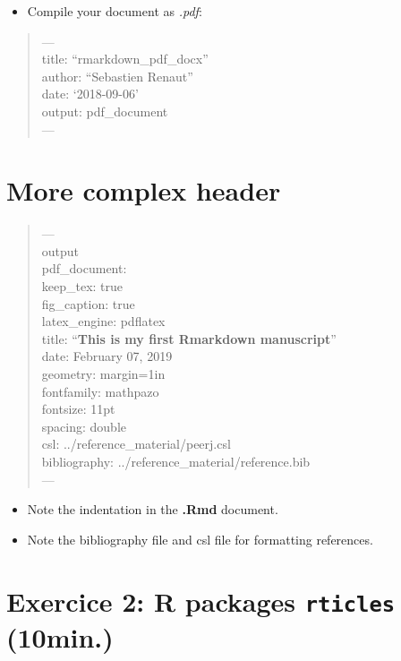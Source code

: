 \documentclass[]{article}
\providecommand{\tightlist}{%
  \setlength{\itemsep}{0pt}\setlength{\parskip}{0pt}}
\begin{document}
\begin{itemize}
\tightlist
\item
  Compile your document as \emph{.pdf}:
\end{itemize}

\begin{quote}
---\\
title: ``rmarkdown\_pdf\_docx''\\
author: ``Sebastien Renaut''\\
date: `2018-09-06'\\
output: pdf\_document\\
---
\end{quote}

\hypertarget{more-complex-header}{%
\section{More complex header}\label{more-complex-header}}

\begin{quote}
---\\
output\\
pdf\_document:\\
keep\_tex: true\\
fig\_caption: true\\
latex\_engine: pdflatex\\
title: ``\textbf{This is my first Rmarkdown manuscript}''\\
date: February 07, 2019\\
geometry: margin=1in\\
fontfamily: mathpazo\\
fontsize: 11pt\\
spacing: double\\
csl: ../reference\_material/peerj.csl\\
bibliography: ../reference\_material/reference.bib\\
---
\end{quote}

\begin{itemize}
\item
  Note the indentation in the \textbf{.Rmd} document.
\item
  Note the bibliography file and csl file for formatting references.
\end{itemize}

\hypertarget{exercice-2-r-packages-rticles-10min.}{%
\section{\texorpdfstring{Exercice 2: R packages \texttt{rticles}
(10min.)}{Exercice 2: R packages rticles (10min.)}}\label{exercice-2-r-packages-rticles-10min.}}
\end{document}
